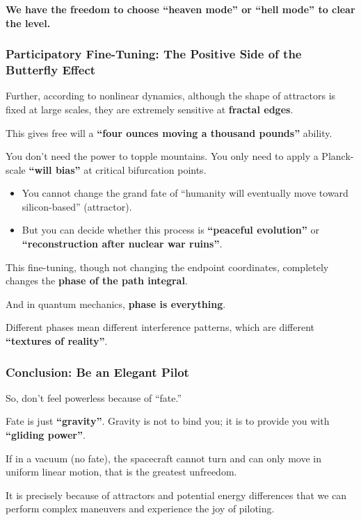 \textbf{We have the freedom to choose ``heaven mode'' or ``hell mode'' to clear the level.}

\subsubsection{Participatory Fine-Tuning: The Positive Side of the Butterfly Effect}

Further, according to nonlinear dynamics, although the shape of attractors is fixed at large scales, they are extremely sensitive at \textbf{fractal edges}.

This gives free will a \textbf{``four ounces moving a thousand pounds''} ability.

You don't need the power to topple mountains. You only need to apply a Planck-scale \textbf{``will bias''} at critical bifurcation points.

\begin{itemize}
\item You cannot change the grand fate of ``humanity will eventually move toward silicon-based'' (attractor).

\item But you can decide whether this process is \textbf{``peaceful evolution''} or \textbf{``reconstruction after nuclear war ruins''}.
\end{itemize}

This fine-tuning, though not changing the endpoint coordinates, completely changes the \textbf{phase of the path integral}.

And in quantum mechanics, \textbf{phase is everything}.

Different phases mean different interference patterns, which are different \textbf{``textures of reality''}.

\subsubsection{Conclusion: Be an Elegant Pilot}

So, don't feel powerless because of ``fate.''

Fate is just \textbf{``gravity''}. Gravity is not to bind you; it is to provide you with \textbf{``gliding power''}.

If in a vacuum (no fate), the spacecraft cannot turn and can only move in uniform linear motion, that is the greatest unfreedom.

It is precisely because of attractors and potential energy differences that we can perform complex maneuvers and experience the joy of piloting.

